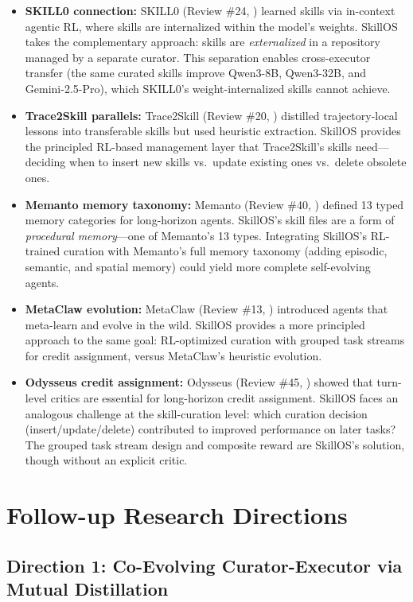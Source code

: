 \documentclass[11pt]{article}
\begin{document}
\begin{itemize}
    \item \textbf{SKILL0 connection:} SKILL0 (Review \#24, \cite{skill0}) learned skills via in-context agentic RL, where skills are internalized within the model's weights. SkillOS takes the complementary approach: skills are \emph{externalized} in a repository managed by a separate curator. This separation enables cross-executor transfer (the same curated skills improve Qwen3-8B, Qwen3-32B, and Gemini-2.5-Pro), which SKILL0's weight-internalized skills cannot achieve.
    \item \textbf{Trace2Skill parallels:} Trace2Skill (Review \#20, \cite{trace2skill}) distilled trajectory-local lessons into transferable skills but used heuristic extraction. SkillOS provides the principled RL-based management layer that Trace2Skill's skills need---deciding when to insert new skills vs.\ update existing ones vs.\ delete obsolete ones.
    \item \textbf{Memanto memory taxonomy:} Memanto (Review \#40, \cite{memanto}) defined 13 typed memory categories for long-horizon agents. SkillOS's skill files are a form of \emph{procedural memory}---one of Memanto's 13 types. Integrating SkillOS's RL-trained curation with Memanto's full memory taxonomy (adding episodic, semantic, and spatial memory) could yield more complete self-evolving agents.
    \item \textbf{MetaClaw evolution:} MetaClaw (Review \#13, \cite{metaclaw}) introduced agents that meta-learn and evolve in the wild. SkillOS provides a more principled approach to the same goal: RL-optimized curation with grouped task streams for credit assignment, versus MetaClaw's heuristic evolution.
    \item \textbf{Odysseus credit assignment:} Odysseus (Review \#45, \cite{odysseus}) showed that turn-level critics are essential for long-horizon credit assignment. SkillOS faces an analogous challenge at the skill-curation level: which curation decision (insert/update/delete) contributed to improved performance on later tasks? The grouped task stream design and composite reward are SkillOS's solution, though without an explicit critic.
\end{itemize}

\section{Follow-up Research Directions}

\subsection{Direction 1: Co-Evolving Curator-Executor via Mutual Distillation}
\end{document}

